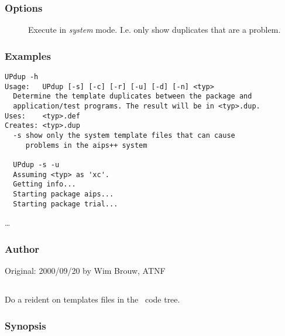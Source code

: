 \subsubsection*{Options}

\begin{description}
\item[]
    Execute in {\em system} mode. I.e. only show duplicates that are a
    problem.
\end{description}

\subsubsection*{Examples}

\begin{verbatim}
UPdup -h
Usage:   UPdup [-s] [-c] [-r] [-u] [-d] [-n] <typ>
  Determine the template duplicates between the package and
  application/test programs. The result will be in <typ>.dup.
Uses:    <typ>.def
Creates: <typ>.dup
  -s show only the system template files that can cause
     problems in the aips++ system

  UPdup -s -u
  Assuming <typ> as 'xc'.
  Getting info...
  Starting package aips...
  Starting package trial...
\end{verbatim}
\ldots

\subsubsection*{Author}

Original: 2000/09/20 by Wim Brouw, ATNF


\newpage

\subsection{}
\label{UPreident}

Do a reident on templates files in the \aipspp\ code tree.

\subsubsection*{Synopsis}

\begin{synopsis}
\end{synopsis}


